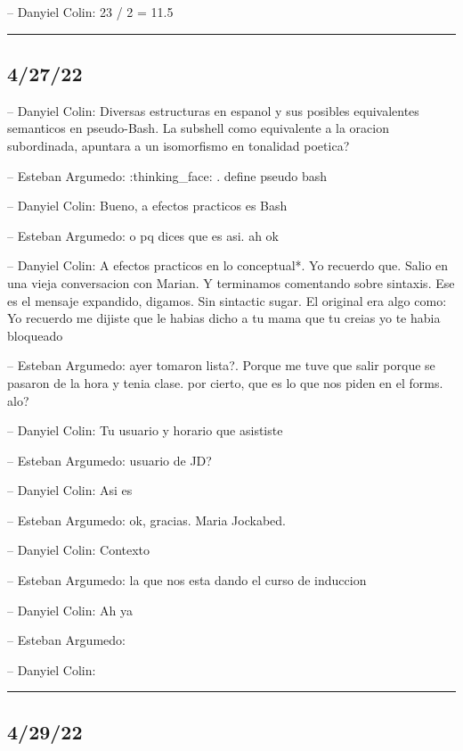 -- Danyiel Colin: 23 / 2 = 11.5

\begin{center}\rule{0.5\linewidth}{0.5pt}\end{center}

\hypertarget{section-64}{%
\subsection{4/27/22}\label{section-64}}

-- Danyiel Colin: Diversas estructuras en espanol y sus posibles
equivalentes semanticos en pseudo-Bash. La subshell como equivalente a
la oracion subordinada, apuntara a un isomorfismo en tonalidad poetica?

-- Esteban Argumedo: :thinking\_face: . define pseudo bash

-- Danyiel Colin: Bueno, a efectos practicos es Bash

-- Esteban Argumedo: o pq dices que es asi. ah ok

-- Danyiel Colin: A efectos practicos en lo conceptual*. Yo recuerdo
que. Salio en una vieja conversacion con Marian. Y terminamos comentando
sobre sintaxis. Ese es el mensaje expandido, digamos. Sin sintactic
sugar. El original era algo como: Yo recuerdo me dijiste que le habias
dicho a tu mama que tu creias yo te habia bloqueado

-- Esteban Argumedo: ayer tomaron lista?. Porque me tuve que salir
porque se pasaron de la hora y tenia clase. por cierto, que es lo que
nos piden en el forms. alo?

-- Danyiel Colin: Tu usuario y horario que asististe

-- Esteban Argumedo: usuario de JD?

-- Danyiel Colin: Asi es

-- Esteban Argumedo: ok, gracias. Maria Jockabed.

-- Danyiel Colin: Contexto

-- Esteban Argumedo: la que nos esta dando el curso de induccion

-- Danyiel Colin: Ah ya

-- Esteban Argumedo:

-- Danyiel Colin:

\begin{center}\rule{0.5\linewidth}{0.5pt}\end{center}

\hypertarget{section-65}{%
\subsection{4/29/22}\label{section-65}}

